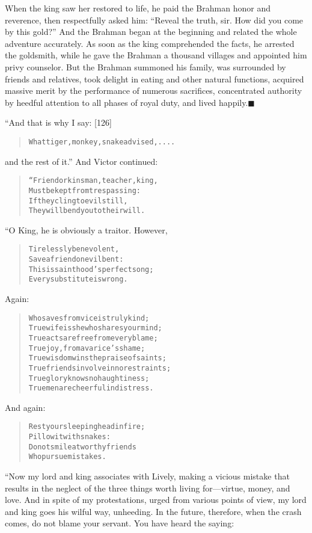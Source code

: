 \documentclass[article, twoside, 14pt]{memoir}
\newcommand{\qed}{\hfill \ensuremath{\blacksquare}}
\renewenvironment{verbatim}{%
\begin{quote}%
\vskip -10pt%
\begin{alltt}\normalfont\large}{\end{alltt}%
\end{quote}%
\vskip -10pt
} %
\begin{document}
When the king saw her restored to life, he paid the Brahman honor
and reverence, then respectfully asked him:
``Reveal the truth, sir. How did you come by this gold?'' And the
Brahman began at the beginning and related the whole adventure
accurately. As soon as the king comprehended the facts, he arrested
the goldsmith, while he gave the Brahman a thousand villages and
appointed him privy counselor. But the Brahman summoned his family,
was surrounded by friends and relatives, took delight in eating and
other natural functions, acquired massive merit by the performance
of numerous sacrifices, concentrated authority by heedful attention
to all phases of royal duty, and lived
happily.\hyperref[s12]{\qed}

“And that is why I say: [126]

\begin{verbatim}
What tiger, monkey, snake advised, ....
\end{verbatim}
and the rest of it.” And Victor continued:

\begin{verbatim}
“Friend or kinsman, teacher, king,
Must be kept from trespassing:
If they cling to evil still,
They will bend you to their will.
\end{verbatim}
“O King, he is obviously a traitor. However,

\begin{verbatim}
Tirelessly benevolent,
Save a friend on evil bent:
This is sainthood's perfect song;
Every substitute is wrong.
\end{verbatim}
Again:

\begin{verbatim}
Who saves from vice is truly kind;
True wife is she who shares your mind;
True acts are free from every blame;
True joy, from avarice's shame;
True wisdom wins the praise of saints;
True friends involve in no restraints;
True glory knows no haughtiness;
True men are cheerful in distress.
\end{verbatim}
And again:

\begin{verbatim}
Rest your sleeping head in fire;
Pillow it with snakes:
Do not smile at worthy friends
Who pursue mistakes.
\end{verbatim}
“Now my lord and king associates with Lively, making a vicious
mistake that results in the neglect of the three things worth
living for---virtue, money, and love. And in spite of my
protestations, urged from various points of view, my lord and king
goes his wilful way, unheeding. In the future, therefore, when the
crash comes, do not blame your servant. You have heard the saying:
\end{document}
